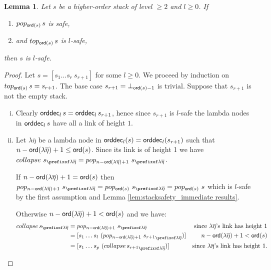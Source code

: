 \documentclass[a4paper]{article}
\newtheorem{lemma}{Lemma}[section]
\theoremstyle{remark}
\theoremstyle{definition}
\newcommand\orddec{{\sf orddec}}
\begin{document}
\begin{lemma}
\label{lem:cons_qsafety} Let $s$ be a higher-order stack of level $\geq 2$ and $l\geq0$.
 If
\begin{enumerate}[1.]
\item $pop_{{\sf ord}(s)}\,s$ is safe,
\item and $top_{{\sf ord}(s)}\,s$ is $l$-safe,
\end{enumerate}
then $s$ is $l$-safe.
\end{lemma}
\begin{proof}
Let $s = [s_1 \ldots s_r~s_{r+1}]$ for some $l\geq0$.
We proceed by induction on  $top_{{\sf ord}(s)}\,s=s_{r+1}$.
The base case $s_{r+1} = \bot_{{\sf ord}(s)-1}$ is trivial.
Suppose that $s_{r+1}$ is not the empty stack.

\begin{enumerate}[(i)]
\item Clearly $\orddec_l\, s = \orddec_l\, s_{r+1}$, hence since $s_{r+1}$ is $l$-safe the lambda nodes in $\orddec_l\, s$ have all a link of height $1$.
 
\item Let $\lambda \overline{\eta}$ be a lambda node in $\orddec_l(s) = \orddec_l(s_{r+1})$ such that $n-{\sf ord}(\lambda \overline{\eta})+1 \leq {\sf ord}(s)$.
Since its link is of height 1 we have
$collapse~s_{\prefixof \lambda \overline{\eta}} = pop_{n-\ord{\lambda \overline{\eta}}+1}~s_{\prefixof \lambda \overline{\eta}}$.

If $n-{\sf ord}(\lambda \overline{\eta})+1 = {\sf ord}(s)$ then
$pop_{n-\ord{\lambda \overline{\eta}}+1}~s_{\prefixof \lambda \overline{\eta}} = pop_{\ord{s}}~s_{\prefixof\lambda\overline\eta} = pop_{\ord{s}}~s$ which is $l$-safe by the first assumption
and Lemma \ref{lem:stacksafety_immediate results}.

Otherwise $n-{\sf ord}(\lambda \overline{\eta})+1 < {\sf ord}(s)$ and we have:
\begin{align*}
  collapse\,s_{\prefixof\lambda\overline\eta}
      &= pop_{n-\ord{\lambda \overline{\eta}}+1}~s_{\prefixof\lambda\overline\eta}
      & \mbox{since $\lambda\overline\eta$'s link has height 1} \\
  &= [ s_1 \ldots s_l\ (pop_{n-\ord{\lambda\overline\eta}+1}~ {s_{r+1}}_{\prefixof\lambda\overline\eta}) ]
   & \mbox{$n-\ord{\lambda \overline{\eta}}+1<\ord{s}$}  \\
  &= [s_1 \ldots s_p\ (collapse\, {s_{r+1}}_{\prefixof\lambda\overline\eta}) ]
  & \mbox{since $\lambda\overline\eta$'s link has height 1.}
\end{align*}


\end{enumerate}
\end{proof}
\end{document}
